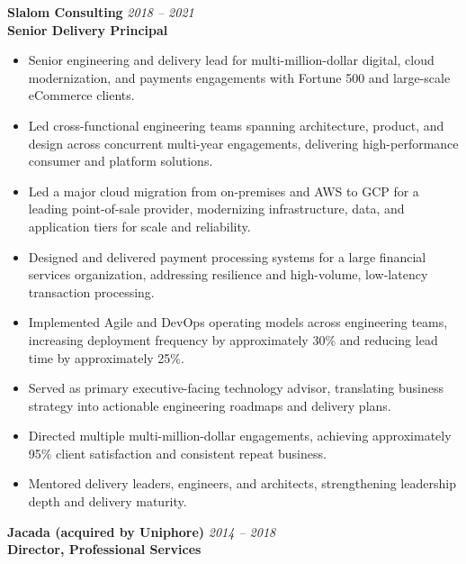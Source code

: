 \documentclass[11pt]{article}
\begin{document}
\vspace{6pt}

\textbf{Slalom Consulting} \hfill \textit{2018 -- 2021} \\
\textbf{Senior Delivery Principal}

\begin{itemize}
  \item Senior engineering and delivery lead for multi-million-dollar digital, cloud modernization, and payments engagements with Fortune 500 and large-scale eCommerce clients.
  \item Led cross-functional engineering teams spanning architecture, product, and design across concurrent multi-year engagements, delivering high-performance consumer and platform solutions.
  \item Led a major cloud migration from on-premises and AWS to GCP for a leading point-of-sale provider, modernizing infrastructure, data, and application tiers for scale and reliability.
  \item Designed and delivered payment processing systems for a large financial services organization, addressing resilience and high-volume, low-latency transaction processing.
  \item Implemented Agile and DevOps operating models across engineering teams, increasing deployment frequency by approximately 30\% and reducing lead time by approximately 25\%.
  \item Served as primary executive-facing technology advisor, translating business strategy into actionable engineering roadmaps and delivery plans.
  \item Directed multiple multi-million-dollar engagements, achieving approximately 95\% client satisfaction and consistent repeat business.
  \item Mentored delivery leaders, engineers, and architects, strengthening leadership depth and delivery maturity.
\end{itemize}

\vspace{6pt}

\textbf{Jacada (acquired by Uniphore)} \hfill \textit{2014 -- 2018} \\
\textbf{Director, Professional Services}
\end{document}
